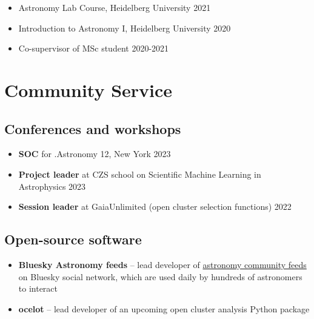 \documentclass[12pt, letterpaper]{hunt-cv}
\begin{document}
\begin{itemize}
    \item Astronomy Lab Course, Heidelberg University \hfill 2021
    \item Introduction to Astronomy I, Heidelberg University \hfill 2020
    \item Co-supervisor of MSc student \hfill 2020-2021
\end{itemize}


\section*{Community Service}

\subsection*{Conferences and workshops}

\begin{itemize}
    \item \textbf{SOC} for .Astronomy 12, New York \hfill 2023
    \item \textbf{Project leader} at CZS school on Scientific Machine Learning in Astrophysics \hfill 2023
    \item \textbf{Session leader} at GaiaUnlimited (open cluster selection functions) \hfill 2022
\end{itemize}

\subsection*{Open-source software \href{\cvGitHubLink}{\faGithub}}

\begin{itemize}
    \item \textbf{Bluesky Astronomy feeds} -- lead developer of \href{https://github.com/emilyhunt/bluesky-astronomy-feeds}{astronomy community feeds} on Bluesky social network, which are used daily by hundreds of astronomers to interact
    \item \textbf{ocelot} -- lead developer of an upcoming open cluster analysis Python package
\end{itemize}



\end{document}

